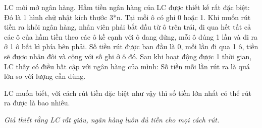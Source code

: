LC mới mở ngân hàng. Hầm tiền ngân hàng của LC được thiết kế rất đặc biệt: Đó là 1 hình chữ nhật kích thước 3*n. Tại mỗi ô có ghi 0 hoặc 1. Khi muốn rút tiền ra khỏi ngân hàng, nhân viên phải bắt đầu từ ô trên trái, đi qua hết tất cả các ô của hầm tiền theo các ô kề cạnh với ô đang đứng, mỗi ô đúng 1 lần và đi ra ở 1 ô bất kì phía bên phải. Số tiền rút được ban đầu là 0, mỗi lần đi qua 1 ô, tiền sẽ được nhân đôi và cộng với số ghi ở ô đó. Sau khi hoạt động được 1 thời gian, LC thấy có điều bất cập với ngân hàng của mình: Số tiền mỗi lần rút ra là quá lớn so với lượng cần dùng.  

   LC muốn biết, với cách rút tiền đặc biệt như vậy thì số tiền lớn nhất có thể rút ra được là bao nhiêu.  

\emph{    Giả thiết rằng LC rất giàu, ngân hàng luôn đủ tiền cho mọi cách rút.   }

\